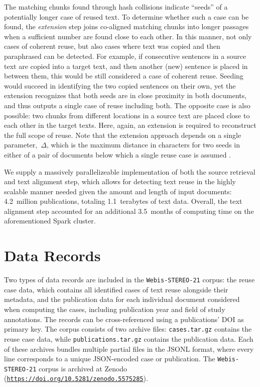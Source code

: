 \documentclass[fleqn,10pt]{wlscirep}
\newcommand{\webisReuseCorpus}{\texttt{Webis-STEREO-21}\xspace}
\begin{document}
The matching chunks found through hash collisions indicate ``seeds'' of a potentially longer case of reused text. To determine whether such a case can be found, the \emph{extension} step joins co-aligned matching chunks into longer passages when a sufficient number are found close to each other. In this manner, not only cases of coherent reuse, but also cases where text was copied and then paraphrased can be detected. For example, if consecutive sentences in a source text are copied into a target text, and then another (new) sentence is placed in between them, this would be still considered a case of coherent reuse. Seeding would succeed in identifying the two copied sentences on their own, yet the extension recognizes that both seeds are in close proximity in both documents, and thus outputs a single case of reuse including both. The opposite case is also possible: two chunks from different locations in a source text are placed close to each other in the target texts. Here, again, an extension is required to reconstruct the full scope of reuse. Note that the extension approach depends on a single parameter,~$\Delta$, which is the maximum distance in characters for two seeds in either of a pair of documents below which a single reuse case is assumed \cite{stamatatos:2011}.

We supply a massively parallelizeable implementation of both the source retrieval and text alignment step, which allows for detecting text reuse in the highly scalable manner needed given the amount and length of input documents: 4.2~million publications, totaling 1.1~terabytes of text data. Overall, the text alignment step accounted for an additional 3.5~months of computing time on the aforementioned Spark cluster.


\section*{Data Records}

Two types of data records are included in the \webisReuseCorpus corpus: the reuse case data, which contains all identified cases of text reuse alongside their metadata, and the publication data for each individual document considered when computing the cases, including publication year and field of study annotations. The records can be cross-referenced using a publications' DOI as primary key. The corpus consists of two archive files: \texttt{cases.tar.gz} contains the reuse case data, while \texttt{publications.tar.gz} contains the publication data. Each of these archives bundles multiple partial files in the JSONL format, where every line corresponds to a unique JSON-encoded case or publication. The \webisReuseCorpus corpus is archived at Zenodo (\href{http://doi.org/10.5281/zenodo.5575285}{\texttt{https://doi.org/10.5281/zenodo.5575285}}\cite{zenodo-metadata}). 
\end{document}
